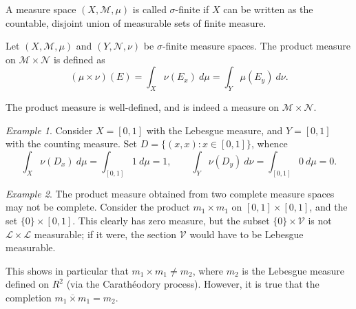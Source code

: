 \documentclass[11pt]{article}
\newcommand{\M}{\mathcal{M}}
\newcommand{\MN}{\mathcal{N}}
\renewcommand{\L}{\mathcal{L}}
\theoremstyle{definition}
\theoremstyle{remark}
\newtheorem*{example}{Example}
\numberwithin{equation}{section}
\begin{document}
    \begin{definition}
        A measure space $(X, \M, \mu)$ is called $\sigma$-finite if $X$ can be
        written as the countable, disjoint union of measurable sets of finite
        measure.
    \end{definition}

    \begin{definition}
        Let $(X, \M, \mu)$ and $(Y, \MN, \nu)$ be $\sigma$-finite measure spaces.
        The product measure on $\M \times \MN$ is defined as \[
            (\mu \times \nu)(E) = \int_X \nu(E_x)\:d\mu = \int_Y \mu(E_y)\:d\nu.
        \] 
    \end{definition}

    \begin{lemma}
        The product measure is well-defined, and is indeed a measure on $\M\times
        \MN$.
    \end{lemma}

    \begin{example}
        Consider $X = [0, 1]$ with the Lebesgue measure, and $Y = [0, 1]$ with the
        counting measure. Set $D = \{(x, x): x \in [0, 1]\}$, whence \[
            \int_{X}\nu(D_x)\:d\mu = \int_{[0, 1]} 1\:d\mu = 1, \qquad
            \int_{Y}\nu(D_y)\:d\nu = \int_{[0, 1]} 0\:d\mu = 0.
        \] 
    \end{example}

    \begin{example}
        The product measure obtained from two complete measure spaces may not be
        complete. Consider the product $m_1 \times m_1$ on $[0, 1] \times [0, 1]$,
        and the set $\{0\} \times [0, 1]$. This clearly has zero measure, but the
        subset $\{0\} \times \mathcal{V}$ is not $\L\times \L$ measurable; if it
        were, the section $\mathcal{V}$ would have to be Lebesgue measurable.

        This shows in particular that $m_1 \times m_1 \neq m_2$, where $m_2$ is the
        Lebesgue measure defined on $R^2$ (via the Carath\'eodory process). However,
        it is true that the completion $\overline{m_1 \times m_1} = m_2$.
    \end{example}
\end{document}
